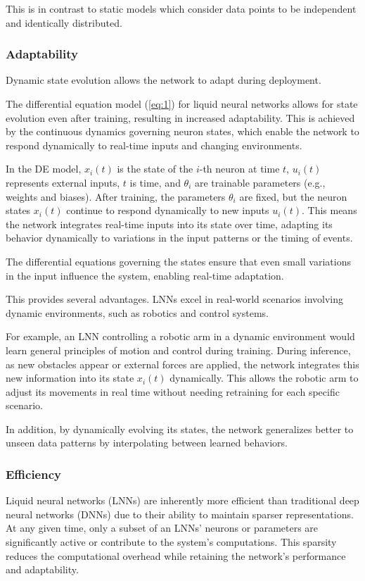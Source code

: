 This is in contrast to static models which consider data points to be independent and identically distributed.

\subsubsection*{Adaptability}
Dynamic state evolution allows the network to adapt during deployment.

The differential equation model (\ref{eq:1}) for liquid neural networks allows for state evolution even after training, resulting in increased adaptability. This is achieved by the continuous dynamics governing neuron states, which enable the network to respond dynamically to real-time inputs and changing environments.

In the DE model, \(x_i(t)\) is the state of the \(i\)-th neuron at time \(t\), \(u_i(t)\) represents external inputs, \(t\) is time, and \(\theta_i\) are trainable parameters (e.g., weights and biases). After training, the parameters \(\theta_i\) are fixed, but the neuron states \(x_i(t)\) continue to respond dynamically to new inputs \(u_i(t)\). This means the network integrates real-time inputs into its state over time, adapting its behavior dynamically to variations in the input patterns or the timing of events.

The differential equations governing the states ensure that even small variations in the input influence the system, enabling real-time adaptation.

This provides several advantages. LNNs excel in real-world scenarios involving dynamic environments, such as robotics \cite{chahineRobustFlightNavigation2023} and control systems.

For example, an LNN controlling a robotic arm in a dynamic environment would learn general principles of motion and control during training. During inference, as new obstacles appear or external forces are applied, the network integrates this new information into its state \(x_i(t)\) dynamically. This allows the robotic arm to adjust its movements in real time without needing retraining for each specific scenario.

In addition, by dynamically evolving its states, the network generalizes better to unseen data patterns by interpolating between learned behaviors.

\subsubsection*{Efficiency}
Liquid neural networks (LNNs) are inherently more efficient than traditional deep neural networks (DNNs) due to their ability to maintain sparser representations. At any given time, only a subset of an LNNs' neurons or parameters are significantly active or contribute to the system's computations. This sparsity reduces the computational overhead while retaining the network's performance and adaptability.

